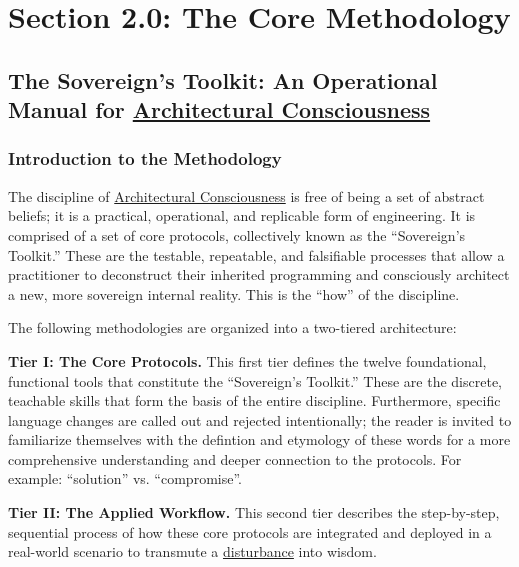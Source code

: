 \documentclass{article}
\begin{document}


\section*{Section 2.0: The Core Methodology}
\subsection*{The Sovereign's Toolkit: An Operational Manual for \hyperlink{gloss:architectural_consciousness}{Architectural Consciousness}}
\subsubsection*{Introduction to the Methodology}

The discipline of \hyperlink{gloss:architectural_consciousness}{Architectural Consciousness} is free of being a set of abstract beliefs; it is a practical, operational, and replicable form of engineering. It is comprised of a set of core protocols, collectively known as the ``Sovereign's Toolkit.'' These are the testable, repeatable, and falsifiable processes that allow a practitioner to deconstruct their inherited programming and consciously architect a new, more sovereign internal reality. This is the ``how'' of the discipline.

The following methodologies are organized into a two-tiered architecture:

\begin{nobullet}
    \item \textbf{Tier I: The Core Protocols.} This first tier defines the twelve foundational, functional tools that constitute the ``Sovereign's Toolkit.'' These are the discrete, teachable skills that form the basis of the entire discipline. Furthermore, specific language changes are called out and rejected intentionally; the reader is invited to familiarize themselves with the defintion and etymology of these words for a more comprehensive understanding and deeper connection to the protocols. For example: ``solution'' vs. ``compromise''.

    \item \textbf{Tier II: The Applied Workflow.} This second tier describes the step-by-step, sequential process of how these core protocols are integrated and deployed in a real-world scenario to transmute a \hyperlink{gloss:disturbance}{disturbance} into wisdom.
\end{nobullet}
\end{document}
